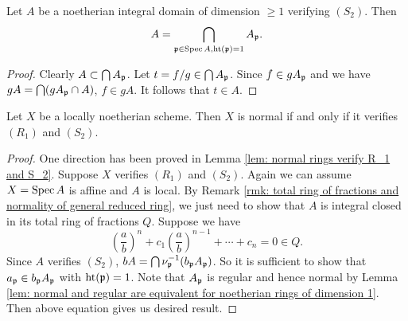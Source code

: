    \begin{proposition}\label{prop: S_2 implies intersection of localization at height 1 prime is A}
        Let $A$ be a noetherian integral domain of dimension $\geq 1$ verifying $(S_2)$.
        Then 
        \[ A = \bigcap_{{\mathfrak{p}} \in \operatorname{Spec} A, \operatorname{ht}({\mathfrak{p}}) = 1} A_{\mathfrak{p}}. \]
    \end{proposition}
    \begin{proof}
        Clearly $A \subset \bigcap A_{\mathfrak{p}}$.
        Let $t = f/g \in \bigcap A_{\mathfrak{p}}$.
        Since $f\in gA_{\mathfrak{p}}$ and we have $g A = \bigcap (gA_{\mathfrak{p}} \cap A)$, $f \in gA$.
        It follows that $t \in A$.
    \end{proof}

    \begin{theorem}
        Let $X$ be a locally noetherian scheme.
        Then $X$ is normal if and only if it verifies $(R_1)$ and $(S_2)$.
    \end{theorem}
    \begin{proof}
        One direction has been proved in Lemma \ref{lem: normal rings verify R_1 and S_2}.
        Suppose $X$ verifies $(R_1)$ and $(S_2)$.
        Again we can assume $X = \operatorname{Spec} A$ is affine and $A$ is local.
        By Remark \ref{rmk: total ring of fractions and normality of general reduced ring}, we just need to show that $A$ is integral closed in its total ring of fractions $Q$.
        Suppose we have 
        \[ \left(\frac{a}{b}\right)^n + c_1 \left(\frac{a}{b}\right)^{n-1} + \cdots + c_n = 0 \in Q. \]
        Since $A$ verifies $(S_2)$, $b A = \bigcap \nu_{\mathfrak{p}}^{-1}(b_{\mathfrak{p}} A_{\mathfrak{p}})$.
        So it is sufficient to show that $a_{{\mathfrak{p}}} \in b_{\mathfrak{p}} A_{\mathfrak{p}}$ with $\operatorname{ht}({\mathfrak{p}}) = 1$.
        Note that $A_{\mathfrak{p}}$ is regular and hence normal by Lemma \ref{lem: normal and regular are equivalent for noetherian rings of dimension 1}.
        Then above equation gives us desired result.
    \end{proof}

    